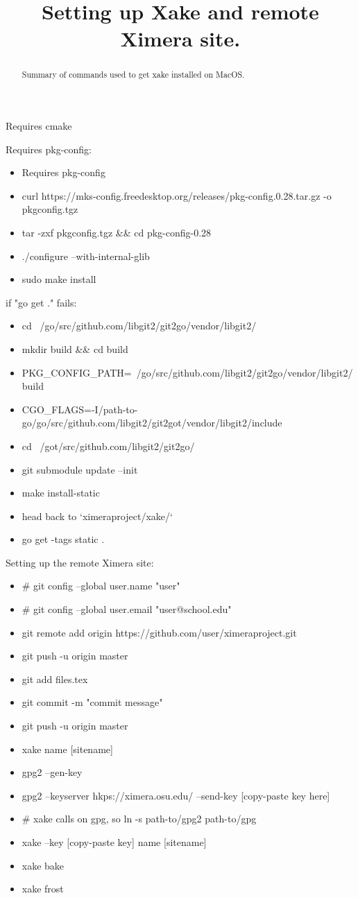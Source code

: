 \documentclass{ximera}
\title{Setting up Xake and remote Ximera site.}
\begin{document}
\begin{abstract}
Summary of commands used to get xake installed on MacOS.
\end{abstract}

\maketitle

Requires cmake

Requires pkg-config:
\begin{itemize}
\item Requires pkg-config
\item curl https://mks-config.freedesktop.org/releases/pkg-config.0.28.tar.gz -o pkgconfig.tgz
\item tar -zxf pkgconfig.tgz \&\& cd pkg-config-0.28
\item ./configure --with-internal-glib
\item sudo make install
\end{itemize}

if "go get ." fails:
\begin{itemize}
\item cd ~/go/src/github.com/libgit2/git2go/vendor/libgit2/ 
\item mkdir build \&\& cd build
\item PKG\_CONFIG\_PATH=~/go/src/github.com/libgit2/git2go/vendor/libgit2/build
\item CGO\_FLAGS=-I/path-to-go/go/src/github.com/libgit2/git2got/vendor/libgit2/include
\item cd ~/got/src/github.com/libgit2/git2go/ 
\item git submodule update --init
\item make install-static
\item head back to `ximeraproject/xake/`
\item go get -tags static .
\end{itemize}

Setting up the remote Ximera site:
\begin{itemize}
\item \# git config --global user.name "user"
\item \# git config --global user.email "user@school.edu"
\item git remote add origin https://github.com/user/ximeraproject.git
\item git push -u origin master
\item git add files.tex
\item git commit -m "commit message"
\item git push -u origin master
\item xake name [sitename]
\item gpg2  --gen-key
\item gpg2 --keyserver hkps://ximera.osu.edu/ --send-key [copy-paste key here]
\item \# xake calls on gpg, so ln -s path-to/gpg2 path-to/gpg
\item xake --key [copy-paste key] name [sitename]
\item xake bake
\item xake frost
\end{itemize}
\end{document}
